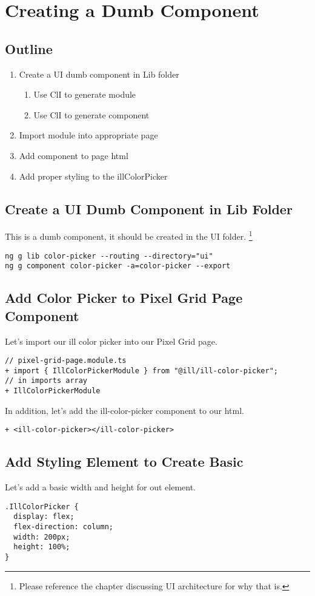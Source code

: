 
\chapter{ Creating a Dumb Component }

\section {Outline}

\begin{enumerate}
  \item Create a UI dumb component in Lib folder
    \begin{enumerate}
      \item Use ClI to generate module
      \item Use ClI to generate component
    \end{enumerate}
  \item Import module into appropriate page
  \item Add component to page html
  \item Add proper styling to the illColorPicker
\end{enumerate}

\section {Create a UI Dumb Component in Lib Folder}
This is a dumb component, it should be created in the UI folder.
\footnote{Please reference the chapter discussing UI architecture for why
that is.}

\begin{lstlisting}
ng g lib color-picker --routing --directory="ui"
ng g component color-picker -a=color-picker --export
\end{lstlisting}

\section{ Add Color Picker to Pixel Grid Page Component }
Let's import our ill color picker into our Pixel Grid page.

\begin{lstlisting}
// pixel-grid-page.module.ts
+ import { IllColorPickerModule } from "@ill/ill-color-picker";
// in imports array
+ IllColorPickerModule
\end{lstlisting}

In addition, let's add the ill-color-picker component to our html.
\begin{lstlisting}
+ <ill-color-picker></ill-color-picker>
\end{lstlisting}

\section{ Add Styling Element to Create Basic  }
Let's add a basic width and height for out element.
\begin{lstlisting}
.IllColorPicker {
  display: flex;
  flex-direction: column;
  width: 200px;
  height: 100%;
}
\end{lstlisting}
